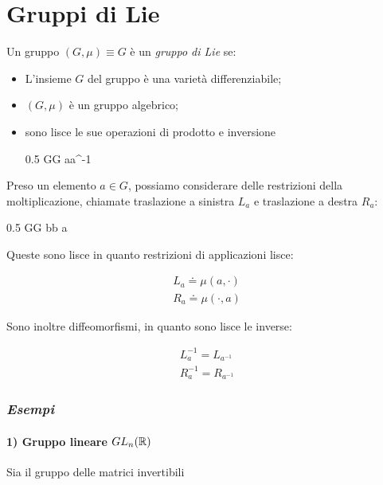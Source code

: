 \section{Gruppi di Lie}

Un gruppo $ (G,\mu) \equiv G $ è un \textit{gruppo di Lie} se:

\begin{itemize}
	\item L'insieme $ G $ del gruppo è una varietà differenziabile;
	
	\item $ (G,\mu) $ è un gruppo algebrico;
	
	\item sono lisce le sue operazioni di prodotto e inversione
	
		{0.5}{%
					{G}{G}
					{a}{a^{-1}}
				}
\end{itemize}
		
Preso un elemento $ a \in G $, possiamo considerare delle restrizioni della moltiplicazione, chiamate traslazione a sinistra $ L_{a} $ e traslazione a destra $ R_{a} $:

	{0.5}{%
				{G}{G}
				{b}{b a}
			}

Queste sono lisce in quanto restrizioni di applicazioni lisce:

\begin{gather}
	L_{a} \doteq \mu(a,\cdot) \\
	R_{a} \doteq \mu(\cdot,a) 
\end{gather}

Sono inoltre diffeomorfismi, in quanto sono lisce le inverse:

\begin{gather}
	L_{a}^{-1} = L_{a^{-1}} \\
	R_{a}^{-1} = R_{a^{-1}}
\end{gather}

\subsubsection{\textit{Esempi}}

\paragraph{1) Gruppo lineare $ GL_{n}(\mathbb{R}) $}

Sia il gruppo delle matrici invertibili

